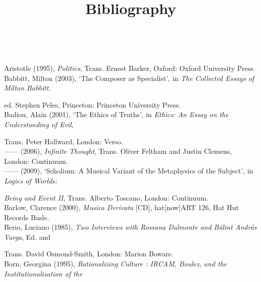 \paragraph{}
\paragraph{}
\begin{flushleft}
\huge 
\marginpar{}
\title{\textbf{Bibliography}}  
\hypertarget{aristotle}{}\\
\end{flushleft}
\vspace{20pt} 
\normalsize
Aristotle (1995), \emph{Politics}, Trans. Ernest Barker, Oxford: Oxford University Press. 
\hypertarget{babbitt}{}\\
Babbitt, Milton (2003), `The Composer as Specialist', in \emph{The Collected Essays of Milton Babbitt}.  

ed. Stephen Peles,  Princeton: Princeton University Press. 
\hypertarget{badiouethics}{}\\
Badiou, Alain (2001), `The Ethics of Truths', in \emph{Ethics: An Essay on the Understanding of Evil}, 

Trans. Peter Hallward, London: Verso. 
\hypertarget{infthought}{}\\
------ (2006), \emph{Infinite Thought}, Trans. Oliver Feltham and Justin Clemens, London: Continuum. 
\hypertarget{badioumus}{}\\
------ (2009), `Scholium: A Musical Variant of the Metaphysics of the Subject', in \emph{Logics of Worlds:}

\emph{Being and Event II}, Trans. Alberto Toscano, London: Continuum. 
\hypertarget{barlow}{}\\
Barlow, Clarence (2000), \emph{Musica Derivata} [CD], hat[now]ART 126, Hat Hut Records Basle. 
\hypertarget{berio}{}\\
Berio, Luciano (1985), \emph{Two Interviews with Rossana Dalmonte and B\'{a}lint Andr\'{a}s Varga},  Ed. and 

Trans. David Osmond-Smith, London: Marion Bowars. 
\hypertarget{born}{}\\
Born, Georgina (1995), \emph{Rationalizing Culture : IRCAM, Boulez, and the Institutionalization of the}

